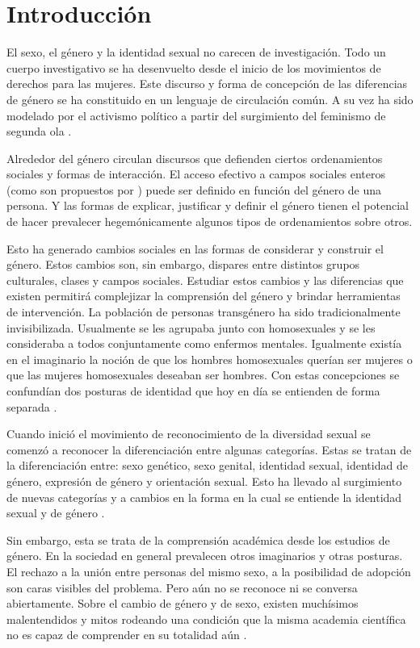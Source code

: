 \chapter{Introducción}
El sexo, el género y la identidad sexual no carecen de investigación.
Todo un cuerpo investigativo se ha desenvuelto desde el inicio de los
movimientos de derechos para las mujeres.
Este discurso y forma de concepción de las diferencias de género se ha
constituido en un lenguaje de circulación común.
A su vez ha sido modelado por el activismo político a partir del surgimiento del
feminismo de segunda ola \parencite{Helfrich2001}.

Alrededor del género circulan discursos que defienden ciertos ordenamientos
sociales y formas de interacción.
El acceso efectivo a campos sociales enteros (como son propuestos por
\textcite{Bourdieu1992}) puede ser definido en función del género de una
persona.
Y las formas de explicar, justificar y definir el género tienen el potencial de
hacer prevalecer hegemónicamente algunos tipos de ordenamientos sobre otros.

Esto ha generado cambios sociales en las formas de considerar y construir el
género.
Estos cambios son, sin embargo, dispares entre distintos grupos culturales,
clases y campos sociales.
Estudiar estos cambios y las diferencias que existen permitirá complejizar la
comprensión del género y brindar herramientas de intervención.
La población de personas transgénero ha sido tradicionalmente invisibilizada.
Usualmente se les agrupaba junto con homosexuales y se les consideraba a todos
conjuntamente como enfermos mentales.
Igualmente existía en el imaginario la noción de que los hombres homosexuales
querían ser mujeres o que las mujeres homosexuales deseaban ser hombres.
Con estas concepciones se confundían dos posturas de identidad que hoy en día se
entienden de forma separada \parencite{MejiaTurizo2010-06}.

Cuando inició el movimiento de reconocimiento de la diversidad sexual se comenzó
a reconocer la diferenciación entre algunas categorías.
Estas se tratan de la diferenciación entre: sexo genético, sexo genital,
identidad sexual, identidad de género, expresión de género y orientación sexual.
Esto ha llevado al surgimiento de nuevas categorías y a cambios en la forma en
la cual se entiende la identidad sexual y de género
\parencite{Figari2010,Bleichmar2006}.

Sin embargo, esta se trata de la comprensión académica desde los estudios de
género.
En la sociedad en general prevalecen otros imaginarios y otras posturas.
El rechazo a la unión entre personas del mismo sexo, a la posibilidad de
adopción son caras visibles del problema.
Pero aún no se reconoce ni se conversa abiertamente.
Sobre el cambio de género y de sexo, existen muchísimos malentendidos y mitos
rodeando una condición que la misma academia científica no es capaz de
comprender en su totalidad aún \parencite{Bleichmar2006}.

